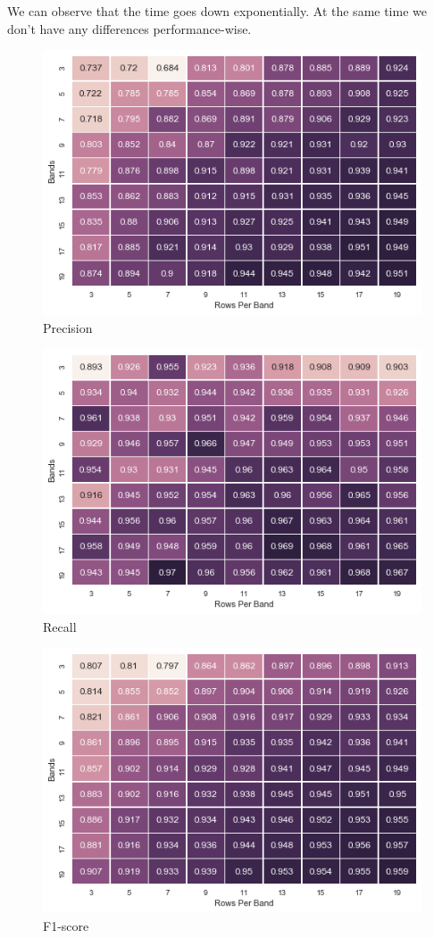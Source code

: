 \documentclass[12pt]{article}
\begin{document}
We can observe that the time goes down exponentially. At the same time we don't have any differences performance-wise.

\begin{figure}[t]
\caption{Precision}
\includegraphics[scale=0.7]{precision.png}
\centering
\end{figure}


\begin{figure}[t]
\caption{Recall}
\includegraphics[scale=0.7]{recall.png}
\centering
\end{figure}


\begin{figure}[t]
\caption{F1-score}
\includegraphics[scale=0.7]{fscore.png}
\centering
\end{figure}
\end{document}
